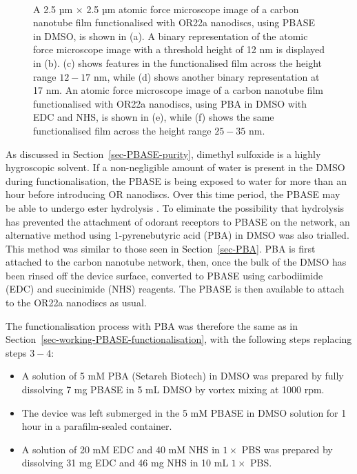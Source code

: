 \documentclass[
  a4paper,
]{scrbook}
\begin{document}
\begin{figure}
\begin{minipage}[t]{0.01\linewidth}
{\centering 

~

}

\end{minipage}%

\caption[A 2.5 µm \(\times\) 2.5 µm atomic force microscope image of a
carbon nanotube film functionalised with OR22a nanodiscs using PBASE in
DMSO, with masking and binary representations used to indicate substrate
and nanodisc heights.]{\label{fig-DMSO-AFM-comparison}A 2.5 µm
\(\times\) 2.5 µm atomic force microscope image of a carbon nanotube
film functionalised with OR22a nanodiscs, using PBASE in DMSO, is shown
in (a). A binary representation of the atomic force microscope image
with a threshold height of 12 nm is displayed in (b). (c) shows features
in the functionalised film across the height range \(12-17\) nm, while
(d) shows another binary representation at 17 nm. An atomic force
microscope image of a carbon nanotube film functionalised with OR22a
nanodiscs, using PBA in DMSO with EDC and NHS, is shown in (e), while
(f) shows the same functionalised film across the height range \(25-35\)
nm.}

\end{figure}

As discussed in Section~\ref{sec-PBASE-purity}, dimethyl sulfoxide is a
highly hygroscopic solvent. If a non-negligible amount of water is
present in the DMSO during functionalisation, the PBASE is being exposed
to water for more than an hour before introducing OR nanodiscs. Over
this time period, the PBASE may be able to undergo ester hydrolysis
\autocite{Hermanson2013-3}. To eliminate the possibility that hydrolysis
has prevented the attachment of odorant receptors to PBASE on the
network, an alternative method using 1-pyrenebutyric acid (PBA) in DMSO
was also trialled. This method was similar to those seen in
Section~\ref{sec-PBA}. PBA is first attached to the carbon nanotube
network, then, once the bulk of the DMSO has been rinsed off the device
surface, converted to PBASE using carbodiimide (EDC) and succinimide
(NHS) reagents. The PBASE is then available to attach to the OR22a
nanodiscs as usual.

The functionalisation process with PBA was therefore the same as in
Section~\ref{sec-working-PBASE-functionalisation}, with the following
steps replacing steps \(3-4\):

\begin{itemize}
\item
  A solution of 5 mM PBA (Setareh Biotech) in DMSO was prepared by fully
  dissolving 7 mg PBASE in 5 mL DMSO by vortex mixing at 1000 rpm.
\item
  The device was left submerged in the 5 mM PBASE in DMSO solution for 1
  hour in a parafilm-sealed container.
\item
  A solution of 20 mM EDC and 40 mM NHS in \(1 \times\) PBS was prepared
  by dissolving 31 mg EDC and 46 mg NHS in 10 mL \(1 \times\) PBS.
\end{itemize}
\end{document}
